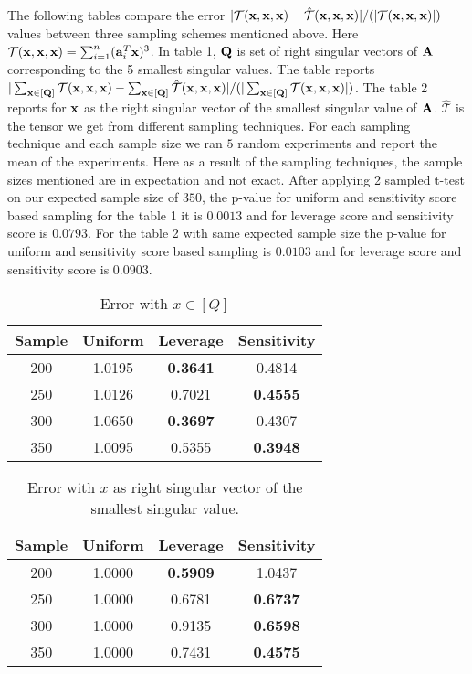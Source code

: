 The following tables compare the error $|\mathcal{T}(\mathbf{x},\mathbf{x},\mathbf{x}) - \mathcal{\hat{T}}(\mathbf{x},\mathbf{x},\mathbf{x})|/(|\mathcal{T}(\mathbf{x},\mathbf{x},\mathbf{x})|)$ values  between three sampling schemes mentioned above. Here $\mathcal{T}(\mathbf{x},\mathbf{x},\mathbf{x}) = \sum_{i=1}^{n}(\mathbf{a}_{i}^T\mathbf{x})^3$. In table 1, $\mathbf{Q}$ is set of right singular vectors of $\mathbf{A}$ corresponding to the 5 smallest singular values. The table reports $|\sum_{\mathbf{x}\in[\mathbf{Q}]}\mathcal{T}(\mathbf{x},\mathbf{x},\mathbf{x}) - \sum_{\mathbf{x}\in[\mathbf{Q}]}\mathcal{\hat{T}}(\mathbf{x},\mathbf{x},\mathbf{x})|/(|\sum_{\mathbf{x}\in[\mathbf{Q}]}\mathcal{T}(\mathbf{x},\mathbf{x},\mathbf{x})|)$. The table 2 reports for $\mathbf{x}$ as the right singular vector of the smallest singular value of $\mathbf{A}$. $\hat{\mathcal{T}}$ is the tensor we get from different sampling techniques. For each sampling technique and each sample size we ran $5$ random experiments and report the  mean of the experiments. Here as a result of the sampling techniques, the sample sizes mentioned are in expectation and not exact. After applying 2 sampled t-test on our expected sample size of $350$, the p-value for uniform and sensitivity score based sampling for the table 1 it is $0.0013$ and for leverage score and sensitivity score is $0.0793$. For the table 2 with same expected sample size the p-value for uniform and sensitivity score based sampling is $0.0103$ and for leverage score and sensitivity score is $0.0903$.

\begin{table}[htbp]
    \centering
    \begin{tabular}{|c|c|c|c|}
    \hline
    Sample & Uniform & Leverage & Sensitivity \\
    \hline
    200 & 1.0195 & \textbf{0.3641} & 0.4814  \\
    \hline
    250 & 1.0126 & 0.7021 & \textbf{0.4555} \\
    \hline
    300 & 1.0650 & \textbf{0.3697} & 0.4307 \\
    \hline
    350 & 1.0095 & 0.5355 & \textbf{0.3948} \\
    \hline
    \end{tabular}
    \caption{Error with $x \in [Q]$}
    \label{tab:query_set}
\end{table}
\begin{table}[htbp]
    \centering
\begin{tabular}{|c|c|c|c|}
        \hline
        Sample & Uniform & Leverage & Sensitivity \\
        \hline
        200 & 1.0000 & \textbf{0.5909} & 1.0437 \\
        \hline
        250 & 1.0000 & 0.6781 & \textbf{0.6737} \\
        \hline
        300 & 1.0000 & 0.9135 & \textbf{0.6598} \\
        \hline
        350 & 1.0000 & 0.7431 & \textbf{0.4575} \\
        \hline
    \end{tabular}\\
    \caption{Error with $x$ as right singular vector of the smallest singular value.}
    \label{tab:max_variance}
\end{table}